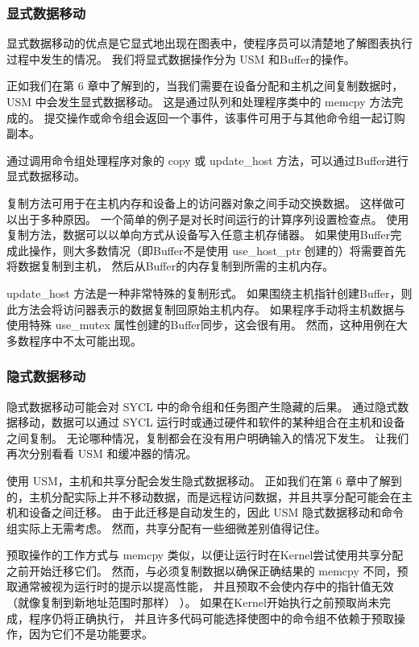 \subsubsection{显式数据移动}
显式数据移动的优点是它显式地出现在图表中，使程序员可以清楚地了解图表执行过程中发生的情况。 
我们将显式数据操作分为 USM 和Buffer的操作。

正如我们在第 6 章中了解到的，当我们需要在设备分配和主机之间复制数据时，USM 中会发生显式数据移动。 
这是通过队列和处理程序类中的 memcpy 方法完成的。 
提交操作或命令组会返回一个事件，该事件可用于与其他命令组一起订购副本。

通过调用命令组处理程序对象的 copy 或 update\_host 方法，可以通过Buffer进行显式数据移动。

复制方法可用于在主机内存和设备上的访问器对象之间手动交换数据。 这样做可以出于多种原因。 
一个简单的例子是对长时间运行的计算序列设置检查点。 使用复制方法，数据可以以单向方式从设备写入任意主机存储器。 
如果使用Buffer完成此操作，则大多数情况（即Buffer不是使用 use\_host\_ptr 创建的）将需要首先将数据复制到主机，
然后从Buffer的内存复制到所需的主机内存。

update\_host 方法是一种非常特殊的复制形式。 
如果围绕主机指针创建Buffer，则此方法会将访问器表示的数据复制回原始主机内存。 
如果程序手动将主机数据与使用特殊 use\_mutex 属性创建的Buffer同步，这会很有用。 
然而，这种用例在大多数程序中不太可能出现。

\subsubsection{隐式数据移动}
隐式数据移动可能会对 SYCL 中的命令组和任务图产生隐藏的后果。 
通过隐式数据移动，数据可以通过 SYCL 运行时或通过硬件和软件的某种组合在主机和设备之间复制。 
无论哪种情况，复制都会在没有用户明确输入的情况下发生。 让我们再次分别看看 USM 和缓冲器的情况。

使用 USM，主机和共享分配会发生隐式数据移动。 
正如我们在第 6 章中了解到的，主机分配实际上并不移动数据，而是远程访问数据，并且共享分配可能会在主机和设备之间迁移。 
由于此迁移是自动发生的，因此 USM 隐式数据移动和命令组实际上无需考虑。 
然而，共享分配有一些细微差别值得记住。

预取操作的工作方式与 memcpy 类似，以便让运行时在Kernel尝试使用共享分配之前开始迁移它们。 
然而，与必须复制数据以确保正确结果的 memcpy 不同，预取通常被视为运行时的提示以提高性能，
并且预取不会使内存中的指针值无效（就像复制到新地址范围时那样） ）。 
如果在Kernel开始执行之前预取尚未完成，程序仍将正确执行，
并且许多代码可能选择使图中的命令组不依赖于预取操作，因为它们不是功能要求。

